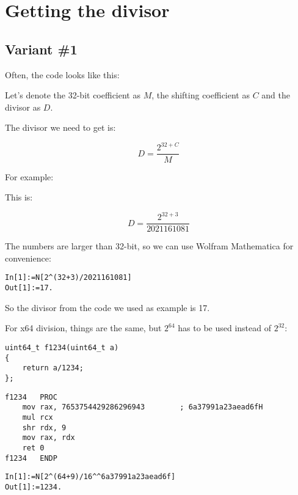 ﻿\section{Getting the divisor}

\subsection{Variant \#1}

Often, the code looks like this:



Let's denote the 32-bit  coefficient as $M$, the shifting coefficient as $C$ and the divisor as $D$.

The divisor we need to get is:

\[
D=\frac{2^{32 + C}}{M}
\]

For example:



This is:

\[
D=\frac{2^{32 + 3}}{2021161081}
\]


The numbers are larger than 32-bit, so we can use Wolfram Mathematica for convenience:

\begin{lstlisting}[caption=Wolfram Mathematica]
In[1]:=N[2^(32+3)/2021161081]
Out[1]:=17.
\end{lstlisting}

So the divisor from the code we used as example is 17.

For x64 division, things 
are the same, but $2^{64}$ has to be used instead of $2^{32}$:

\begin{lstlisting}
uint64_t f1234(uint64_t a)
{
	return a/1234;
};
\end{lstlisting}

\begin{lstlisting}[caption=\Optimizing MSVC 2012 x64]
f1234	PROC
	mov	rax, 7653754429286296943		; 6a37991a23aead6fH
	mul	rcx
	shr	rdx, 9
	mov	rax, rdx
	ret	0
f1234	ENDP
\end{lstlisting}

\begin{lstlisting}[caption=Wolfram Mathematica]
In[1]:=N[2^(64+9)/16^^6a37991a23aead6f]
Out[1]:=1234.
\end{lstlisting}

